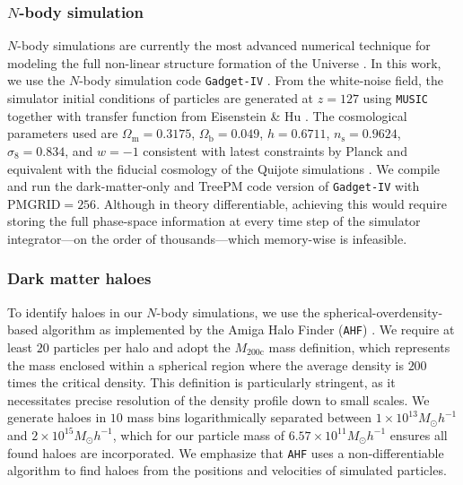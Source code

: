 \subsubsection{$N$-body simulation}
$N$-body simulations are currently the most advanced numerical technique for modeling the full non-linear structure formation of the Universe \citep{Vogelsberger2020,Angulo2021}. In this work, we use the $N$-body simulation code \texttt{Gadget-IV} \citep{Springel2021}. From the white-noise field, the simulator initial conditions of particles are generated at $z=127$ using \texttt{MUSIC} \citep{Hahn2011} together with transfer function from Eisenstein \& Hu \citep{Eisenstein1998,Eisenstein1999}. The cosmological parameters used are $\Omega_\mathrm{m} = 0.3175$, $\Omega_\mathrm{b} = 0.049$, $h = 0.6711$, $n_\mathrm{s} = 0.9624$, $\sigma_8 = 0.834$, and $w=-1$ consistent with latest constraints by Planck \citep{Aghanim2018} and equivalent with the fiducial cosmology of the Quijote simulations \citep{Villaescusa-Navarro2020}. We compile and run the dark-matter-only and TreePM code version of \texttt{Gadget-IV} with $\mathrm{PMGRID}=256$. Although in theory differentiable, achieving this would require storing the full phase-space information at every time step of the simulator integrator—on the order of thousands—which memory-wise is infeasible.

\subsubsection{Dark matter haloes}
\label{sec:amiga}
To identify haloes in our $N$-body simulations, we use the spherical-overdensity-based algorithm \citep{Press1974,Warren1992,Lacey1994} as implemented by the Amiga Halo Finder (\texttt{AHF}) \citep{Gill2004,Knollmann2009}. We require at least $20$ particles per halo and adopt the \( M_{200\mathrm{c}} \) mass definition, which represents the mass enclosed within a spherical region where the average density is $200$ times the critical density. This definition is particularly stringent, as it necessitates precise resolution of the density profile down to small scales. We generate haloes in $10$ mass bins logarithmically separated between $1\times 10^{13}M_{\odot}h^{-1}$ and $2\times 10^{15}M_{\odot}h^{-1}$, which for our particle mass of $6.57 \times 10^{11} M_{\odot}h^{-1}$ ensures all found haloes are incorporated. We emphasize that \texttt{AHF} uses a non-differentiable algorithm to find haloes from the positions and velocities of simulated particles.

